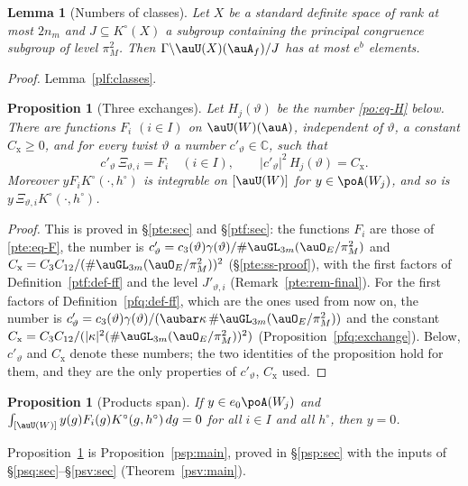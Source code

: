 \documentclass[10pt]{amsart}
\newtheorem{proposition}[theorem]{Proposition}
\newtheorem{lemma}[theorem]{Lemma}
\theoremstyle{definition}
\theoremstyle{remark}
\newcommand{\C}{\mathbb C}
\begin{document}
\begin{lemma}[Numbers of classes]\label{po:classes}
Let $X$ be a standard definite space of rank at most $2n_m$ and $J\subseteq K^\circ(X)$ a subgroup
containing the principal congruence subgroup of level $\pi_M^2$. Then $\Gamma\backslash\auU(X)
(\auA_f)/J$ has at most $e^b$ elements.
\end{lemma}
\noindent\emph{Proof.} Lemma~\ref{plf:classes}.


\begin{proposition}[Three exchanges]\label{po:exchange}
Let $H_j(\vartheta)$ be the number \eqref{po:eq-H} below. There are functions $F_i$ $(i\in I)$ on
$\auU(W)(\auA)$, independent of $\vartheta$, a constant $C_{\mathrm x}\ge0$, and for every twist
$\vartheta$ a number $c'_\vartheta\in\C$, such that
\[
c'_\vartheta\,\Xi_{\vartheta,i}=F_i\quad(i\in I),\qquad|c'_\vartheta|^2\,H_j(\vartheta)=
C_{\mathrm x}.
\]
Moreover $yF_iK^\circ(\cdot,h^\circ)$ is integrable on $[\auU(W)]$ for $y\in\poA(W_j)$, and so is
$y\,\Xi_{\vartheta,i}K^\circ(\cdot,h^\circ)$.
\end{proposition}
\begin{proof}
This is proved in \S\ref{pte:sec} and \S\ref{ptf:sec}: the functions $F_i$ are those of \eqref{pte:eq-F}, the
number is $c'_\vartheta=c_3(\vartheta)\gamma(\vartheta)/\allowbreak \#\auGL_{3m}(\auO_E/\pi_M^2)$ and $C_{\mathrm x}=C_3C_{12}/
\allowbreak (\#\auGL_{3m}(\auO_E/\pi_M^2))^2$ (\S\ref{pte:ss-proof}), with the first factors of Definition~\ref{ptf:def-ff}
and the level $J'_{\vartheta,i}$ (Remark~\ref{pte:rem-final}). For the first factors of
Definition~\ref{pfq:def-ff}, which are the ones used from now on, the number is
$c'_\vartheta=c_3(\vartheta)\gamma(\vartheta)/(\aubar\kappa\,\#\auGL_{3m}(\auO_E/\pi_M^2))$ and the constant
$C_{\mathrm x}=C_3C_{12}/(|\kappa|^2(\#\auGL_{3m}(\auO_E/\pi_M^2))^2)$ (Proposition~\ref{pfq:exchange}).
Below, $c'_\vartheta$ and $C_{\mathrm x}$ denote these numbers; the two identities of the proposition
hold for them, and they are the only properties of $c'_\vartheta$, $C_{\mathrm x}$ used.
\end{proof}


\begin{proposition}[Products span]\label{po:span}
If $y\in e_0\poA(W_j)$ and $\int_{[\auU(W)]}y(g)F_i(g)K^\circ(g,h^\circ)\,dg=0$ for all $i\in I$
and all $h^\circ$, then $y=0$.
\end{proposition}
\noindent Proposition~\ref{po:span} is Proposition~\ref{psp:main}, proved in \S\ref{psp:sec} with the inputs
of \S\ref{psq:sec}--\S\ref{psv:sec} (Theorem~\ref{psv:main}).
\end{document}
